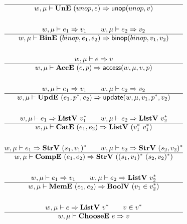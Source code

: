 \begin{gather*}
  \hline
  w, \mu \vdash \une ~ (unop, e) \Rightarrow \unop(unop, v) \\
%
\newline \\
  w, \mu \vdash e_1 \Rightarrow v_1 \qquad w, \mu \vdash e_2 \Rightarrow v_2 \\
  \hline
  w, \mu \vdash \bine ~ (binop, e_1, e_2) \Rightarrow \binop(binop, v_1, v_2) \\
%
\newline \\
  w, \mu \vdash e \Rightarrow v \\
  \hline
  w, \mu \vdash \acce ~ (e, p) \Rightarrow \access(w, \mu, v, p) \\
%
\newline \\
  w, \mu \vdash e_1 \Rightarrow v_1 \qquad w, \mu \vdash e_2 \Rightarrow v_2 \\
  \hline
  w, \mu \vdash \upde ~ (e_1, \seq p, e_2) \Rightarrow \update(w, \mu, v_1, \seq p, v_2) \\
%
\newline \\
   w, \mu \vdash e_1 \Rightarrow \listv ~ \seq{v_1} \qquad
   w, \mu \vdash e_2 \Rightarrow \listv ~ \seq{v_2} \\
  \hline
  w, \mu \vdash \cate ~ (e_1, e_2) \Rightarrow \listv ~ (\seq{v_1} ~ \seq{v_1}) \\
%
\newline \\
   w, \mu \vdash e_1 \Rightarrow \strv ~ \seq{(s_1, v_1)} \qquad
   w, \mu \vdash e_2 \Rightarrow \strv ~ \seq{(s_2, v_2)} \\
  \hline
  w, \mu \vdash \compe ~ (e_1, e_2) \Rightarrow \strv ~ (\seq{(s_1, v_1)} ~ \seq{(s_2, v_2)}) \\
%
\newline \\
  w, \mu \vdash e_1 \Rightarrow v_1 \qquad
  w, \mu \vdash e_2 \Rightarrow \listv ~ \seq{v_2} \\
  \hline
  w, \mu \vdash \meme ~ (e_1, e_2) \Rightarrow \boolv ~ (v_1 \in \seq{v_2}) \\
%
\newline \\
  w, \mu \vdash e \Rightarrow \listv ~ \seq{v} \qquad
  v \in \seq{v} \\
  \hline
  w, \mu \vdash \choosee ~ e \Rightarrow v \\
%
\newline \\

\end{gather*}
